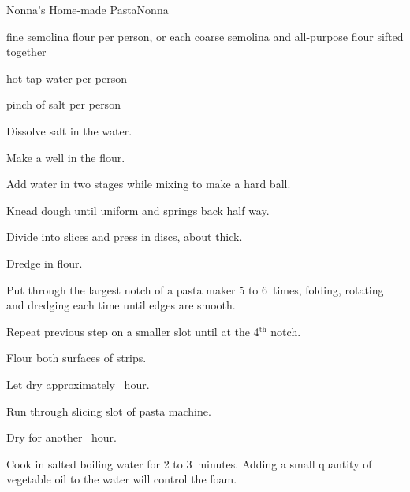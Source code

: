 \begin{recipe}{Nonna's Home-made Pasta}{Nonna}{}

\begin{ingredients}
\item {} fine semolina flour per person, or  each coarse semolina and all-purpose flour sifted together
\item {} hot tap water per person
\item pinch of salt per person
\end{ingredients}

\begin{directions}
\item Dissolve salt in the water.
\item Make a well in the flour.
\item Add water in two stages while mixing to make a hard ball.
\item Knead dough until uniform and springs back half way.
\item Divide into slices and press in  discs, about \inch{\threequarter} thick.
\item Dredge in flour.
\item Put through the largest notch of a pasta maker 5 to 6~times, folding, rotating and dredging each time until edges are smooth.
\item Repeat previous step on a smaller slot until at the 4$^{\mathrm{th}}$ notch.
\item Flour both surfaces of strips.
\item Let dry approximately \half~hour.
\item Run through slicing slot of pasta machine.
\item Dry for another \half~hour.
\item Cook in salted boiling water for 2 to 3~minutes. Adding a small quantity of vegetable oil to the water will control the foam.
\end{directions}

\end{recipe}
